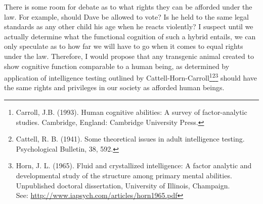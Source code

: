 \documentclass[letterpaper,10pt,twoside]{article}
\begin{document}
There is some room for debate as to what rights they can be afforded under the law.  For example, should Dave be allowed to vote?  Is he held to the same legal standards as any other child his age when he reacts violently?  I suspect until we actually determine what the functional cognition of such a hybrid entails, we can only speculate as to how far we will have to go when it comes to equal rights under the law.  Therefore, I would propose that any transgenic animal created to show cognitive function comparable to a human being, as determined by application of intelligence testing outlined by Cattell-Horn-Carroll\footnote{Carroll, J.B. (1993). Human cognitive abilities: A survey of factor-analytic studies. Cambridge, England: Cambridge University Press.}\footnote{Cattell, R. B. (1941). Some theoretical issues in adult intelligence testing. Psychological Bulletin, 38, 592.}\footnote{Horn, J. L. (1965). Fluid and crystallized intelligence: A factor analytic and developmental study of the structure among primary mental abilities. Unpublished doctoral dissertation, University of Illinois, Champaign.\\See: \url{http://www.iapsych.com/articles/horn1965.pdf}} should have the same rights and privileges in our society as afforded human beings.
\end{document}

